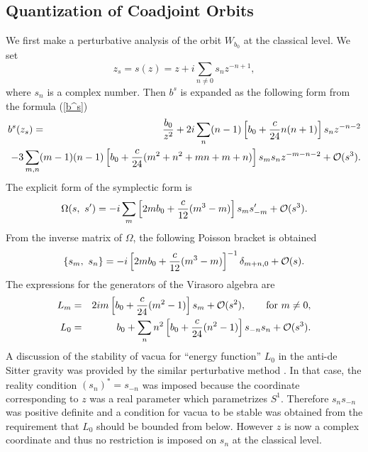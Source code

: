 \documentclass[a4paper,11pt]{article}
\begin{document}
\subsection{Quantization of Coadjoint Orbits}
We first make a perturbative analysis of the orbit $W_{b_0}$ 
at the classical level.
We set 
\begin{equation}
z_s=s(z)=z+i\sum_{n\neq 0}s_n z^{-n+1},
\end{equation}
where $s_n$ is a complex number. 
Then $b^s$ is expanded as the following form from the formula (\ref{b^s})
\begin{eqnarray}
b^s(z_s)&=&\frac{b_0}{z^2}
             +2i\sum_{n}(n-1)\left[b_0+\frac{c}{24}n(n+1)\right]
              s_n z^{-n-2} \nonumber \\
        & & \hspace*{-15mm} -3\sum_{m,n}(m-1)(n-1)
            \left[b_0+\frac{c}{24}(m^2+n^2+mn+m+n)\right]s_m s_n z^{-m-n-2}
             +{\cal O}(s^3).
\end{eqnarray}
The explicit form of the symplectic form is 
\begin{equation}
\Omega(s, \ s')=-i\sum_m\left[2mb_0+\frac{c}{12}(m^3-m)\right]s_m s'_{-m} 
    +{\cal O}(s^3).
\end{equation}
From the inverse matrix of $\Omega$, the following Poisson bracket is 
obtained 
\begin{equation}
\label{s-s}
\left\{s_m, \ s_n\right\} = -i\left[2mb_0+\frac{c}{12}(m^3-m)\right]^{-1}
         \delta_{m+n,0}+{\cal O}(s).
\end{equation}
The expressions for the generators of the Virasoro algebra are 
\begin{eqnarray}
\label{exp-lm}
L_m &=& 2im\left[b_0+\frac{c}{24}(m^2-1)\right]s_{m}+{\cal O}(s^2),
        \qquad {\rm for} \ m\neq 0, \\
\label{exp-l0}
L_0&=&b_0+\sum_{n}n^2 \left[b_0+\frac{c}{24}(n^2-1)\right]s_{-n}s_n
      +{\cal O}(s^3).
\end{eqnarray}
A discussion of the stability of vacua for ``energy function'' $L_{0}$ 
in the anti-de Sitter gravity was
provided by the similar perturbative method \cite{NUY}.  
In that case, the reality condition $(s_n)^*=s_{-n}$ was imposed 
because the coordinate corresponding to $z$ was a real parameter
which parametrizes $S^1$. Therefore $s_n s_{-n}$ was positive definite 
and a condition for vacua to be stable was obtained from the requirement 
that $L_0$ should be bounded from below.
However $z$ is now a complex coordinate and thus no restriction is imposed
on $s_n$ at the classical level. 
\end{document}
